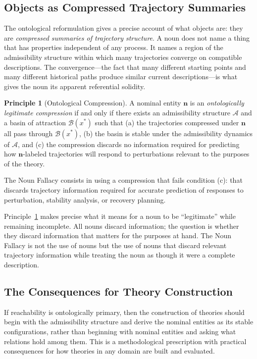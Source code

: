 \documentclass[12pt, a4paper]{article}
\theoremstyle{plain}
\theoremstyle{definition}
\newtheorem{principle}[theorem]{Principle}
\theoremstyle{remark}
\begin{document}
\subsection{Objects as Compressed Trajectory Summaries}

The ontological reformulation gives a precise account of what objects are:
they are \emph{compressed summaries of trajectory structure}. A noun does
not name a thing that has properties independent of any process. It names
a region of the admissibility structure within which many trajectories
converge on compatible descriptions. The convergence---the fact that many
different starting points and many different historical paths produce
similar current descriptions---is what gives the noun its apparent
referential solidity.

\begin{principle}[Ontological Compression]
\label{prin:onto-compress}
A nominal entity $\mathbf{n}$ is an \emph{ontologically legitimate
compression} if and only if there exists an admissibility structure
$\mathcal{A}$ and a basin of attraction $\mathcal{B}(x^*)$ such that
(a) the trajectories compressed under $\mathbf{n}$ all pass through
$\mathcal{B}(x^*)$, (b) the basin is stable under the admissibility
dynamics of $\mathcal{A}$, and (c) the compression discards no information
required for predicting how $\mathbf{n}$-labeled trajectories will respond
to perturbations relevant to the purposes of the theory.

The Noun Fallacy consists in using a compression that fails condition (c):
that discards trajectory information required for accurate prediction of
responses to perturbation, stability analysis, or recovery planning.
\end{principle}

Principle~\ref{prin:onto-compress} makes precise what it means for a noun
to be ``legitimate'' while remaining incomplete. All nouns discard information;
the question is whether they discard information that matters for the purposes
at hand. The Noun Fallacy is not the use of nouns but the use of nouns that
discard relevant trajectory information while treating the noun as though it
were a complete description.

\subsection{The Consequences for Theory Construction}

If reachability is ontologically primary, then the construction of theories
should begin with the admissibility structure and derive the nominal entities
as its stable configurations, rather than beginning with nominal entities and
asking what relations hold among them. This is a methodological prescription
with practical consequences for how theories in any domain are built and
evaluated.
\end{document}
